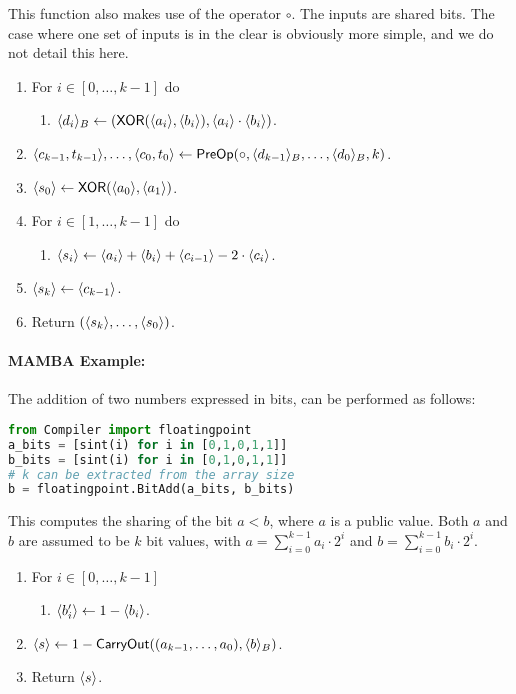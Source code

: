 This function also makes use of the operator $\circ$.
The inputs are shared bits. The case where one set of inputs is in the clear
is obviously more simple, and we do not detail this here.
\begin{enumerate}
\item For $i \in [0,\ldots,k-1]$ do
\begin{enumerate}
\item $\langle d_i \rangle_B \leftarrow (\mathsf{XOR}(\langle a_i \rangle, \langle b_i \rangle),
	                    \langle a_i \rangle\cdot \langle b_i \rangle)$.
\end{enumerate}
\item $\langle c_{k-1},t_{k-1} \rangle,\ldots,\langle c_0,t_0 \rangle  \leftarrow \mathsf{PreOp}(\circ,\langle d_{k-1} \rangle_B,\ldots,\langle d_0 \rangle_B,k)$.
\item $\langle s_0 \rangle \leftarrow \mathsf{XOR}(\langle a_0 \rangle, \langle a_1 \rangle)$.
\item For $i \in [1,\ldots,k-1]$ do
\begin{enumerate}
  \item $\langle s_i \rangle \leftarrow \langle a_i \rangle+\langle b_i \rangle+\langle c_{i-1} \rangle-2\cdot \langle c_i \rangle$.
\end{enumerate}
\item $\langle s_k \rangle \leftarrow \langle c_{k-1} \rangle$.
\item Return $(\langle s_k \rangle,\ldots,\langle s_0 \rangle)$.
\end{enumerate}

\paragraph{MAMBA Example:} The addition of two numbers expressed in bits, can be performed as follows: 
\begin{lstlisting}[language={python}]
from Compiler import floatingpoint
a_bits = [sint(i) for i in [0,1,0,1,1]]
b_bits = [sint(i) for i in [0,1,0,1,1]]
# k can be extracted from the array size
b = floatingpoint.BitAdd(a_bits, b_bits)
\end{lstlisting}

This computes the sharing of the bit $a<b$, where $a$ is a public value.
Both $a$ and $b$ are assumed to be $k$ bit values, with
$a=\sum_{i=0}^{k-1} a_i \cdot 2^i$ and 
$b=\sum_{i=0}^{k-1} b_i \cdot 2^i$.
\begin{enumerate}
\item For $i \in [0,\ldots,k-1]$
\begin{enumerate}
   \item $\langle b_i' \rangle\leftarrow 1-\langle b_i \rangle$.
\end{enumerate}
\item $\langle s \rangle \leftarrow 1- 
	\mathsf{CarryOut}((a_{k-1},\ldots,a_0),\langle b \rangle_B)$.
\item Return $\langle s \rangle$.
\end{enumerate}
